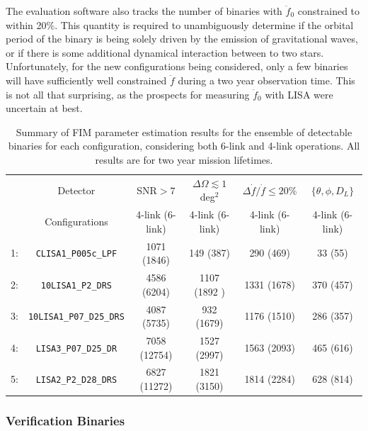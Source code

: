 \documentclass{iopart}
\begin{document}
The evaluation software also tracks the number of binaries with $\ddot{f}_0$ constrained to within 20\%.  This quantity is 
required to unambiguously determine if the orbital period of the binary is being solely driven by the emission of gravitational 
waves, or if there is some additional dynamical interaction between to two stars.  Unfortunately, for the new configurations 
being considered, only a few binaries will have sufficiently well constrained $\ddot{f}$ during a two year observation time.  This is not all that surprising, as the prospects for measuring  $\ddot{f}_0$ with LISA were uncertain at best.
\begin{table}[H]
\begin{center}
\begin{tabular}{cccccc}
\hline\hline
& Detector & SNR$>7$ & $\Delta \Omega \lesssim 1$ deg$^2$ & $\Delta\dot{f}/\dot{f} \leq 20\%$ & $\{\theta,\phi,D_L\}$\\
& Configurations & 4-link (6-link) & 4-link (6-link) & 4-link (6-link)  & 4-link (6-link)\\
\hline
1: &{\tt CLISA1\_P005c\_LPF} & 1071 (1846) & 149 (387) & 290 (469) & 33 (55)\\
2: &{\tt 10LISA1\_P2\_DRS} & 4586 (6204) & 1107 (1892 )& 1331 (1678) & 370 (457)\\
3: &{\tt 10LISA1\_P07\_D25\_DRS} & 4087 (5735) & 932 (1679) & 1176 (1510) & 286 (357)\\
4: &{\tt LISA3\_P07\_D25\_DR} & 7058 (12754) & 1527 (2997) & 1563 (2093) & 465 (616) \\
5: &{\tt LISA2\_P2\_D28\_DRS} & 6827 (11272) & 1821 (3150) & 1814 (2284) & 628 (814) \\
\end{tabular}
\caption{Summary of FIM parameter estimation results for the ensemble of detectable binaries for each configuration, 
considering both 6-link and 4-link operations.  All results are for two year mission lifetimes. }
\label{Table:Fisher}
\end{center}
\end{table}

\subsubsection{Verification Binaries}
\end{document}
